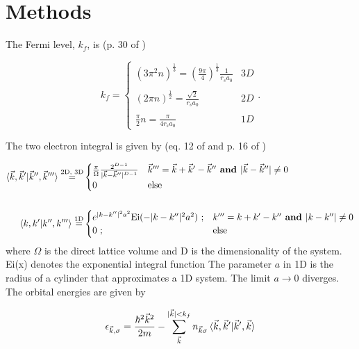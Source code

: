 \documentclass{revtex4}
\begin{document}
\section{Methods}    
    The Fermi level, $k_f$, is (p. 30 of \cite{Guiliani2005})
    
    \begin{equation}
    k_f
    =\begin{cases} 
    (3\pi^2n)^{\frac{1}{3}} = \left(\frac{9\pi}{4}\right)^{\frac{1}{3}}\frac{1}{r_sa_0} & 3D \\ \\
    (2\pi n)^{\frac{1}{2}} = \frac{\sqrt{2}}{r_sa_0}  & 2D \\
    \\
    \frac{\pi}{2}n = \frac{\pi}{4 r_s a_0}   & 1D 
    \end{cases}
    .
    \end{equation}
    
    The two electron integral is given by (eq. 12 of \cite{Delyon2008} and p. 16 of \cite{Guiliani2005})
    
    \begin{subequations}
    	\begin{align}
    	\braket{\vec{k}, \vec{k}'|\vec{k}'',\vec{k}'''}\stackrel{\text{2D, 3D}}{=}&
    	\begin{cases} 
    	\frac{\pi}{\Omega}\frac{2^{D-1}}{|\vec{k}-\vec{k}''|^{D-1}} 
    	& \vec{k}''' = \vec{k}+\vec{k}'-\vec{k}'' \textbf{ and } |\vec{k}-\vec{k}''| \neq 0 \\
    	0 
    	& \text{else}
    	\end{cases}
    	\\ \nonumber \\
    	\braket{k, k'|k'',k'''}\stackrel{\text{1D}}{=}&
    	\begin{cases} 
    	e^{|k-k''|^2a^2}\text{Ei}(-|k-k''|^2a^2)\text{ ;}
    	& k''' = k+k'-k'' \textbf{ and } |k-k''| \neq 0 \\
    	0\text{ ;} 
    	& \text{else}
    	\end{cases}
    	\end{align}
    \end{subequations}
    where $\Omega$ is the direct lattice volume and D is the dimensionality of the system. Ei(x) 
    denotes the exponential integral function The parameter $a$ in 1D is the radius of a cylinder
    that approximates a 1D system. The limit $a \rightarrow 0$ diverges. The orbital energies are given 
    by 
    
    \begin{equation}\label{eq:hf_orb_energy}
    \epsilon_{\vec{k},\sigma}=
    \frac{\hbar^2\vec{k}^2}{2m} - \sum\limits_{\vec{k}}^{|\vec{k}|< k_f}n_{\vec{k}\sigma}\braket{\vec{k}, \vec{k}' |\vec{k}', \vec{k}}
    \end{equation}
    
\end{document}
